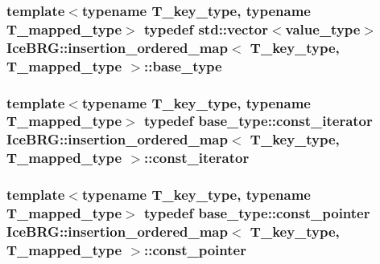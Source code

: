 \subsubsection[{base\+\_\+type}]{\setlength{\rightskip}{0pt plus 5cm}template$<$typename T\+\_\+key\+\_\+type, typename T\+\_\+mapped\+\_\+type$>$ typedef std\+::vector$<${\bf value\+\_\+type}$>$ {\bf Ice\+B\+R\+G\+::insertion\+\_\+ordered\+\_\+map}$<$ T\+\_\+key\+\_\+type, T\+\_\+mapped\+\_\+type $>$\+::{\bf base\+\_\+type}}\label{classIceBRG_1_1insertion__ordered__map_afac747acefbbac2509113178f93cee10}
\hypertarget{classIceBRG_1_1insertion__ordered__map_a69d0d661aae3e27da8aafc22b6db8950}{}
\subsubsection[{const\+\_\+iterator}]{\setlength{\rightskip}{0pt plus 5cm}template$<$typename T\+\_\+key\+\_\+type, typename T\+\_\+mapped\+\_\+type$>$ typedef base\+\_\+type\+::const\+\_\+iterator {\bf Ice\+B\+R\+G\+::insertion\+\_\+ordered\+\_\+map}$<$ T\+\_\+key\+\_\+type, T\+\_\+mapped\+\_\+type $>$\+::{\bf const\+\_\+iterator}}\label{classIceBRG_1_1insertion__ordered__map_a69d0d661aae3e27da8aafc22b6db8950}
\hypertarget{classIceBRG_1_1insertion__ordered__map_a7cea6f693fc996cb361c9e18a3073db2}{}
\subsubsection[{const\+\_\+pointer}]{\setlength{\rightskip}{0pt plus 5cm}template$<$typename T\+\_\+key\+\_\+type, typename T\+\_\+mapped\+\_\+type$>$ typedef base\+\_\+type\+::const\+\_\+pointer {\bf Ice\+B\+R\+G\+::insertion\+\_\+ordered\+\_\+map}$<$ T\+\_\+key\+\_\+type, T\+\_\+mapped\+\_\+type $>$\+::{\bf const\+\_\+pointer}}\label{classIceBRG_1_1insertion__ordered__map_a7cea6f693fc996cb361c9e18a3073db2}
\hypertarget{classIceBRG_1_1insertion__ordered__map_a31d0718377868da407efc5e3c099bb72}{}
